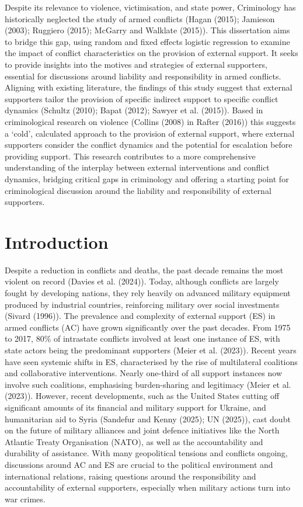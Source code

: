 \documentclass[
]{article}
\begin{document}
Despite its relevance to violence, victimisation, and state power,
Criminology has historically neglected the study of armed conflicts
(Hagan (2015); Jamieson (2003); Ruggiero (2015); McGarry and Walklate
(2015)). This dissertation aims to bridge this gap, using random and
fixed effects logistic regression to examine the impact of conflict
characteristics on the provision of external support. It seeks to
provide insights into the motives and strategies of external supporters,
essential for discussions around liability and responsibility in armed
conflicts. Aligning with existing literature, the findings of this study
suggest that external supporters tailor the provision of specific
indirect support to specific conflict dynamics (Schultz (2010); Bapat
(2012); Sawyer et al. (2015)). Based in criminological research on
violence (Collins (2008) in Rafter (2016)) this suggests a `cold',
calculated approach to the provision of external support, where external
supporters consider the conflict dynamics and the potential for
escalation before providing support. This research contributes to a more
comprehensive understanding of the interplay between external
interventions and conflict dynamics, bridging critical gaps in
criminology and offering a starting point for criminological discussion
around the liability and responsibility of external supporters.

\newpage

\section{Introduction}\label{introduction}

Despite a reduction in conflicts and deaths, the past decade remains the
most violent on record (Davies et al. (2024)). Today, although conflicts
are largely fought by developing nations, they rely heavily on advanced
military equipment produced by industrial countries, reinforcing
military over social investments (Sivard (1996)). The prevalence and
complexity of external support (ES) in armed conflicts (AC) have grown
significantly over the past decades. From 1975 to 2017, 80\% of
intrastate conflicts involved at least one instance of ES, with state
actors being the predominant supporters (Meier et al. (2023)). Recent
years have seen systemic shifts in ES, characterised by the rise of
multilateral coalitions and collaborative interventions. Nearly
one-third of all support instances now involve such coalitions,
emphasising burden-sharing and legitimacy (Meier et al. (2023)).
However, recent developments, such as the United States cutting off
significant amounts of its financial and military support for Ukraine,
and humanitarian aid to Syria (Sandefur and Kenny (2025); UN (2025)),
cast doubt on the future of military alliances and joint defence
initiatives like the North Atlantic Treaty Organisation (NATO), as well
as the accountability and durability of assistance. With many
geopolitical tensions and conflicts ongoing, discussions around AC and
ES are crucial to the political environment and international relations,
raising questions around the responsibility and accountability of
external supporters, especially when military actions turn into war
crimes.
\end{document}
